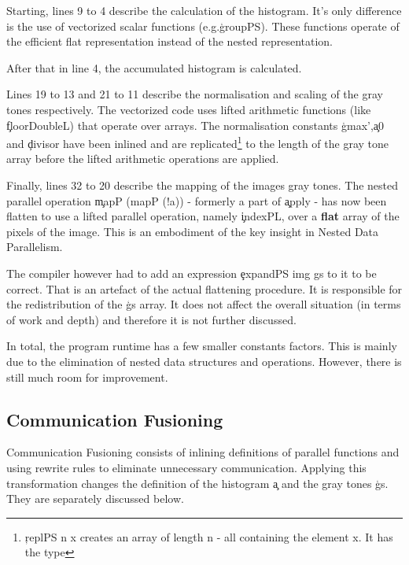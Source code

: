     Starting, lines 9 to 4 describe the calculation of the histogram.
    It's only difference is the use of vectorized scalar functions (e.g.\c{groupPS}). These functions operate of the efficient flat
    representation instead of the nested representation.
    
    After that in line 4, the accumulated histogram is calculated.
    
    Lines 19 to 13 and 21 to 11 describe the normalisation and scaling of the gray tones respectively.
    The vectorized code uses lifted arithmetic functions (like \c{floorDoubleL}) that
    operate over arrays.
    The normalisation constants \c{gmax'},\c{a0} and \c{divisor}
    have been inlined and are replicated\footnote{\c{replPS n x} creates an array of length n - all containing the element x. It has the type }
    to the length of the gray tone array before the lifted arithmetic operations are applied.
    
    
    Finally, lines 32 to 20 describe the mapping of the images gray tones.
    The nested parallel operation \c{mapP (mapP (!a))} - formerly a part of \c{apply} - 
    has now been flatten to use a lifted parallel operation, namely \c{indexPL}, over a \textbf{flat} array of
    the pixels of the image. This is an embodiment of the key insight in Nested Data Parallelism.
    
    The compiler however had to add an expression \c{expandPS img gs} to it to be
    correct. That is an artefact of the actual flattening procedure.
    It is responsible for the redistribution of the \c{gs} array. It does not affect the
    overall situation (in terms of work and depth) and therefore
    it is not further discussed.
    
    In total, the program runtime has a few smaller constants factors. This is mainly due to the elimination of nested data structures
    and operations. However, there is still much room for improvement.
    
  \subsection{Communication Fusioning}
    
    Communication Fusioning consists of inlining definitions of parallel functions and using rewrite rules to eliminate
    unnecessary communication. Applying this transformation changes the definition of the histogram \c{a} and the
    gray tones \c{gs}. They are separately discussed below.
    
